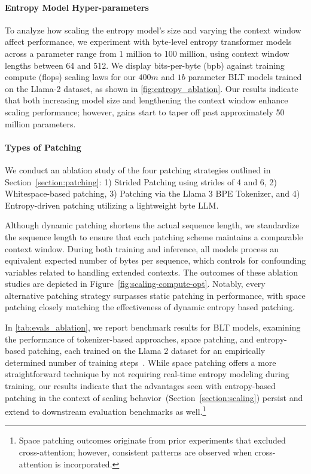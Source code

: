 \paragraph{Entropy Model Hyper-parameters} To analyze how scaling the entropy model's size and varying the context window affect performance, we experiment with byte-level entropy transformer models across a parameter range from 1 million to 100 million, using context window lengths between 64 and 512. We display bits-per-byte (bpb) against training compute (flops) scaling laws for our $400m$ and $1b$ parameter {\textsc BLT} models trained on the Llama-2 dataset, as shown in \autoref{fig:entropy_ablation}. Our results indicate that both increasing model size and lengthening the context window enhance scaling performance; however, gains start to taper off past approximately 50 million parameters.

\paragraph{Types of Patching}

We conduct an ablation study of the four patching strategies outlined in Section~\ref{section:patching}: 1) Strided Patching using strides of 4 and 6, 2) Whitespace-based patching, 3) Patching via the Llama 3 BPE Tokenizer, and 4) Entropy-driven patching utilizing a lightweight byte LLM.

Although dynamic patching shortens the actual sequence length, we standardize the sequence length to ensure that each patching scheme maintains a comparable context window. During both training and inference, all models process an equivalent expected number of bytes per sequence, which controls for confounding variables related to handling extended contexts. The outcomes of these ablation studies are depicted in Figure~\ref{fig:scaling-compute-opt}. Notably, every alternative patching strategy surpasses static patching in performance, with space patching closely matching the effectiveness of dynamic entropy based patching.

In \autoref{tab:evals_ablation}, we report benchmark results for {\textsc BLT} models, examining the performance of tokenizer-based approaches, space patching, and entropy-based patching, each trained on the Llama 2 dataset for an empirically determined number of training steps~\citep{dubey2024llama}. While space patching offers a more straightforward technique by not requiring real-time entropy modeling during training, our results indicate that the advantages seen with entropy-based patching in the context of scaling behavior~(Section~\ref{section:scaling}) persist and extend to downstream evaluation benchmarks as well.\footnote{Space patching outcomes originate from prior experiments that excluded cross-attention; however, consistent patterns are observed when cross-attention is incorporated.}

